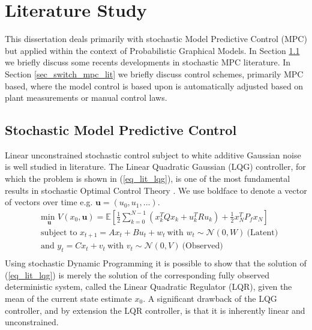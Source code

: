 \section{Literature Study}
This dissertation deals primarily with stochastic Model Predictive Control (MPC) but applied within the context of Probabilistic Graphical Models. In Section \ref{sec_stoch_mpc_lit} we briefly discuss some recents developments in stochastic MPC literature. In Section \ref{sec_switch_mpc_lit} we briefly discuss control schemes, primarily MPC based, where the model control is based upon is automatically adjusted based on plant measurements or manual control laws.

\subsection{Stochastic Model Predictive Control}
\label{sec_stoch_mpc_lit}
Linear unconstrained stochastic control subject to white additive Gaussian noise is well studied in literature. The Linear Quadratic Gaussian (LQG) controller, for which the problem is shown in (\ref{eq_lit_lqg}), is one of the most fundamental results in stochastic Optimal Control Theory \cite{lqg}. We use boldface to denote a vector of vectors over time e.g. $\mathbf{u}=(u_0, u_1,...)$.
\begin{equation}
\begin{aligned}
&\underset{\mathbf{u}}{\text{min }} V(x_0, \mathbf{u}) = \mathbb{E}\left[ \frac{1}{2}\sum_{k=0}^{N-1} \left( x_k^TQx_k + u_k^TRu_k \right) + \frac{1}{2}x_N^TP_fx_N \right] \\
& \text{subject to } x_{t+1}=Ax_t+Bu_t + w_t~\text{with } w_t \sim \mathcal{N}(0, W)~\text{(Latent)} \\
& \text{and } y_{t}= Cx_t + v_t ~\text{with } v_t \sim \mathcal{N}(0, V)~\text{(Observed)}\\
\end{aligned}
\label{eq_lit_lqg}
\end{equation}
Using stochastic Dynamic Programming it is possible to show that the solution of (\ref{eq_lit_lqg}) is merely the solution of the corresponding fully observed deterministic system, called the Linear Quadratic Regulator (LQR), given the mean of the current state estimate $x_0$. A significant drawback of the LQG controller, and by extension the LQR controller, is that it is inherently linear and unconstrained.

